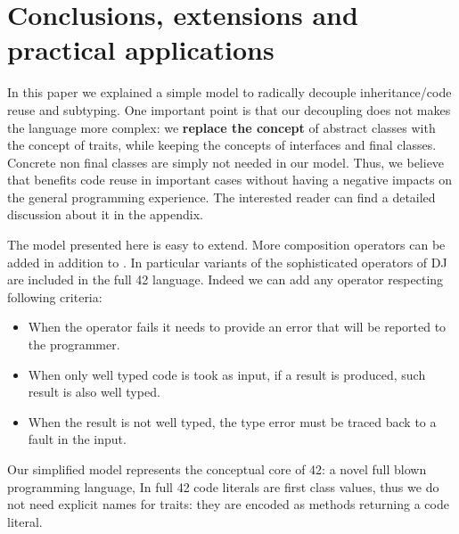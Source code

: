 \saveSpace\saveSpace
\section{Conclusions, extensions and practical applications}
\saveSpace
In this paper we explained a simple model to 
radically decouple inheritance/code reuse and subtyping.
One important point is that our decoupling does not
makes the language more complex:
we \textbf{replace the concept} of abstract classes with
the concept of traits, while keeping the concepts of
interfaces and final classes.
Concrete non final classes are simply not needed in our model.
Thus, we believe that \name benefits
code reuse in important cases 
without having a negative impacts on the general programming experience.
The interested reader can find a detailed discussion about it in the appendix.


The model presented here is easy to extend.
More composition operators can be added in addition to \use.
In particular variants of the sophisticated operators of DJ are
included in the full 42 language.
 Indeed we can add any operator respecting following criteria:

\begin{itemize}
\item When the operator fails it needs to provide an error that will be reported to the programmer.
\item When only well typed code is took as input, if a result is produced,
 such result is also well typed.
\item When the result is not well typed,
the type error must be traced back to
a fault in the input.
 \end{itemize}
 

Our simplified model represents the conceptual core of  42: a novel full blown programming language,
In full 42 code literals are first class values, thus we
do not need explicit names
for traits: they are encoded as methods
 returning a code literal.

\begin{comment}
using the ideas presented in this paper to obtain reliable and understandable metaprogramming.
Formalization (in progress) for full 42 can be found at
\url{http://}\footnote{Omitted for anonymous review}. 
42 extends our model allowing
flattening to execute arbitrary computations.
In such model we do not need an explicit notion of traits: they are encoded as methods returning a code literal.
42 also has features less related to code composition, like
  a strong type system supporting aliasing mutability and circularity control,
   checked exceptions, and errors (unchecked exceptions) with strong-exception-safety.


42 do not have a finite set of composition operators; they can be
added using the built in support for native method calls. They can
be dynamically checked to verify that they are well behaved
according to our predicate, or they can be trusted to achieve
efficiency.
\end{comment}


